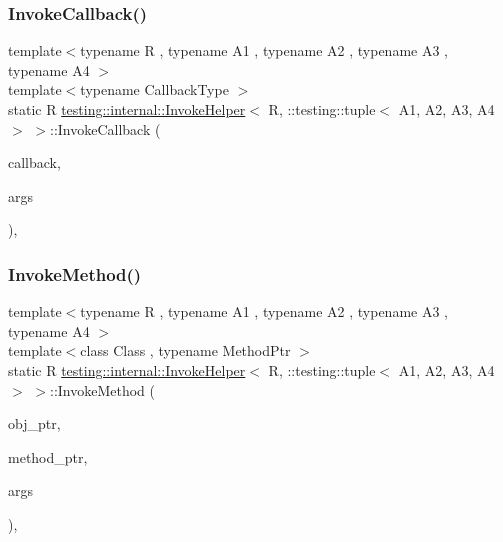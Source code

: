 \subsubsection{\texorpdfstring{InvokeCallback()}{InvokeCallback()}}
{\footnotesize\ttfamily template$<$typename R , typename A1 , typename A2 , typename A3 , typename A4 $>$ \\
template$<$typename Callback\+Type $>$ \\
static R \mbox{\hyperlink{classtesting_1_1internal_1_1_invoke_helper}{testing\+::internal\+::\+Invoke\+Helper}}$<$ R, \+::testing\+::tuple$<$ A1, A2, A3, A4 $>$ $>$\+::Invoke\+Callback (\begin{DoxyParamCaption}\item[{Callback\+Type $\ast$}]{callback,  }\item[{const \+::testing\+::tuple$<$ A1, A2, A3, A4 $>$ \&}]{args }\end{DoxyParamCaption})\hspace{0.3cm}{\ttfamily [inline]}, {\ttfamily [static]}}

\mbox{\label{classtesting_1_1internal_1_1_invoke_helper_3_01_r_00_01_1_1testing_1_1tuple_3_01_a1_00_01_a2_00_01_a3_00_01_a4_01_4_01_4_ad523e518f7f633bdd9f8a14b7d55708f}} 
\subsubsection{\texorpdfstring{InvokeMethod()}{InvokeMethod()}}
{\footnotesize\ttfamily template$<$typename R , typename A1 , typename A2 , typename A3 , typename A4 $>$ \\
template$<$class Class , typename Method\+Ptr $>$ \\
static R \mbox{\hyperlink{classtesting_1_1internal_1_1_invoke_helper}{testing\+::internal\+::\+Invoke\+Helper}}$<$ R, \+::testing\+::tuple$<$ A1, A2, A3, A4 $>$ $>$\+::Invoke\+Method (\begin{DoxyParamCaption}\item[{Class $\ast$}]{obj\+\_\+ptr,  }\item[{Method\+Ptr}]{method\+\_\+ptr,  }\item[{const \+::testing\+::tuple$<$ A1, A2, A3, A4 $>$ \&}]{args }\end{DoxyParamCaption})\hspace{0.3cm}{\ttfamily [inline]}, {\ttfamily [static]}}



